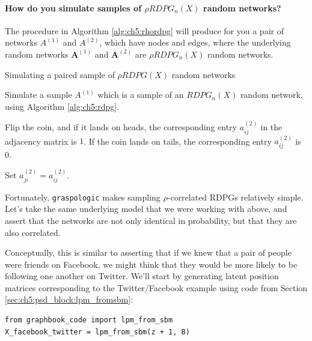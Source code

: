 \paragraph*{How do you simulate samples of $\rho RDPG_n(X)$ random networks?}

The procedure in Algorithm \ref{alg:ch5:rhordpg} will produce for you a pair of networks $A^{(1)}$ and $A^{(2)}$, which have nodes and edges, where the underlying random networks $\mathbf A^{(1)}$ and $\mathbf A^{(2)}$ are $\rho RDPG_n(X)$ random networks.

\begin{algorithm}[h]\caption{Simulating a paired sample of $\rho RDPG(X)$ random networks}
\label{alg:ch5:rhordpg}
\SetAlgoLined
{}

Simulate a sample $A^{(1)}$ which is a sample  of an $RDPG_n(X)$ random network, using Algorithm \ref{alg:ch5:rdpg}.

 {
     {
         
        
        Flip the coin, and if it lands on heads, the corresponding entry $a_{ij}^{(2)}$ in the adjacency matrix is $1$. If the coin lands on tails, the corresponding entry $a_{ij}^{(2)}$ is $0$. 

        Set $a_{ji}^{(2)} = a_{ij}^{(2)}$.
    }
}


\end{algorithm}


Fortunately, \texttt{graspologic} makes sampling $\rho$-correlated RDPGs relatively simple. Let's take the same underlying model that we were working with above, and assert that the networks are not only identical in probability, but that they are also {correlated}. 

Conceptually, this is similar to asserting that if we knew that a pair of people were friends on Facebook, we might think that they would be more likely to be following one another on Twitter. We'll start by generating latent position matrices corresponding to the Twitter/Facebook example using code from Section \ref{sec:ch5:psd_block:lpm_fromsbm}:
\begin{lstlisting}[style=python]
from graphbook_code import lpm_from_sbm
X_facebook_twitter = lpm_from_sbm(z + 1, B)
\end{lstlisting}

